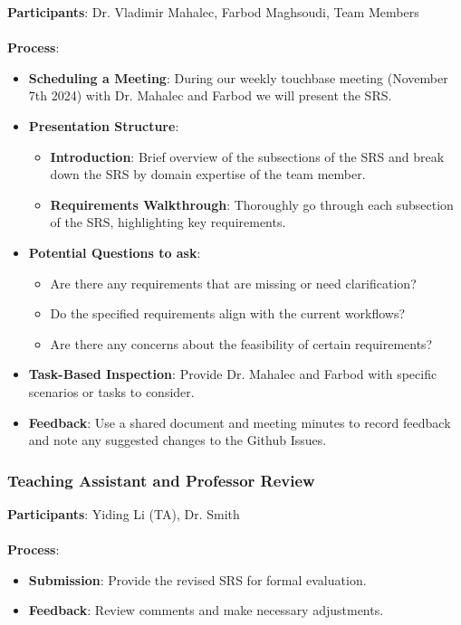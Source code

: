 \documentclass[12pt, titlepage]{article}
\begin{document}
\textbf{Participants}: Dr. Vladimir Mahalec, Farbod Maghsoudi, Team Members
\\\\
\textbf{Process}:
\begin{itemize}
    \item \textbf{Scheduling a Meeting}: During our weekly touchbase meeting (November 7th 2024) with Dr. Mahalec and Farbod we will present the SRS.
    \item \textbf{Presentation Structure}:
    \begin{itemize}
        \item \textbf{Introduction}: Brief overview of the subsections of the SRS and break down the SRS by domain expertise of the team member.
        \item \textbf{Requirements Walkthrough}: Thoroughly go through each subsection of the SRS, highlighting key requirements.
    \end{itemize}
    \item \textbf{Potential Questions to ask}:
    \begin{itemize}
        \item Are there any requirements that are missing or need clarification?
        \item Do the specified requirements align with the current workflows?
        \item Are there any concerns about the feasibility of certain requirements?
    \end{itemize}
    \item \textbf{Task-Based Inspection}: Provide Dr. Mahalec and Farbod with specific scenarios or tasks to consider.
    \item \textbf{Feedback}: Use a shared document and meeting minutes to record feedback and note any suggested changes to the Github Issues.
\end{itemize}

\subsubsection{Teaching Assistant and Professor Review}

\textbf{Participants}: Yiding Li (TA), Dr. Smith
\\\\
\textbf{Process}:
\begin{itemize}
    \item \textbf{Submission}: Provide the revised SRS for formal evaluation.
    \item \textbf{Feedback}: Review comments and make necessary adjustments.
\end{itemize}
\end{document}
